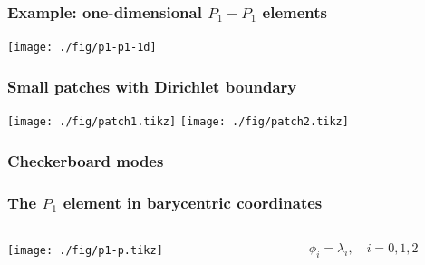 \documentclass[ignorenonframetext,notheorems,aspectratio=1610]{beamer}
\begin{document}

\begin{frame}
  \frametitle{Example: one-dimensional $P_1-P_1$ elements}
  \begin{center}
      \texttt{[image: ./fig/p1-p1-1d]}
  \end{center}
\end{frame}

\begin{frame}
  \frametitle{Small patches with Dirichlet boundary}
  \begin{center}
    \hfill
    \texttt{[image: ./fig/patch1.tikz]}
    \hfill
    \texttt{[image: ./fig/patch2.tikz]}
    \hfill\mbox{}
  \end{center}
\end{frame}

\begin{frame}
  \frametitle{Checkerboard modes}
  
\end{frame}


\begin{frame}
  \frametitle{The $P_1$ element in barycentric coordinates}
  \begin{columns}
    \begin{column}{.5\textwidth}
      \begin{center}
        \texttt{[image: ./fig/p1-p.tikz]}
      \end{center}
    \end{column}
    \begin{column}{.5\textwidth}
      \begin{gather*}
        \phi_i = \lambda_i,
        \quad i=0,1,2
      \end{gather*}
    \end{column}
  \end{columns}
\end{frame}
\end{document}
